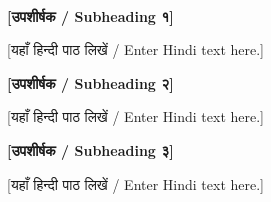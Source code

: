 %
%

\onehalfspacing

\begin{center}
  {\large{}}\\
  \sectionrule[.2\linewidth]
\end{center}

\begin{hindi}

\noindent\textbf{[उपशीर्षक / Subheading १]}

[यहाँ हिन्दी पाठ लिखें / Enter Hindi text here.]

\vspace{3mm}
\noindent\textbf{[उपशीर्षक / Subheading २]}

[यहाँ हिन्दी पाठ लिखें / Enter Hindi text here.]

\vspace{3mm}
\noindent\textbf{[उपशीर्षक / Subheading ३]}

[यहाँ हिन्दी पाठ लिखें / Enter Hindi text here.]

\end{hindi}

%
%

\newpage